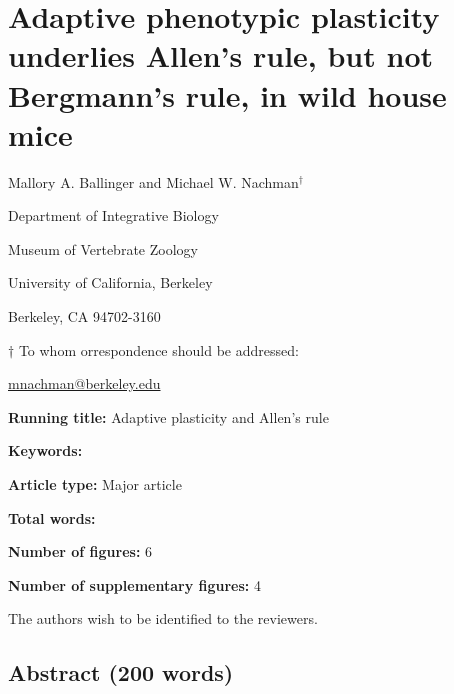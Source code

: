 \documentclass[]{article}
\author{}
\date{\vspace{-2.5em}}
\begin{document}
\hypertarget{adaptive-phenotypic-plasticity-underlies-allens-rule-but-not-bergmanns-rule-in-wild-house-mice}{%
\section{Adaptive phenotypic plasticity underlies Allen's rule, but not
Bergmann's rule, in wild house
mice}\label{adaptive-phenotypic-plasticity-underlies-allens-rule-but-not-bergmanns-rule-in-wild-house-mice}}

\vspace{20mm}

Mallory A. Ballinger and Michael W. Nachman\({^\dagger}\)

\vspace{20mm}

Department of Integrative Biology

Museum of Vertebrate Zoology

University of California, Berkeley

Berkeley, CA 94702-3160

\vspace{10mm}

\({\dagger}\) To whom orrespondence should be addressed:

\href{mailto:mnachman@berkeley.edu}{mnachman@berkeley.edu}

\vspace{30mm}

\textbf{Running title:} Adaptive plasticity and Allen's rule

\textbf{Keywords:}

\textbf{Article type:} Major article

\textbf{Total words:}

\textbf{Number of figures:} 6

\textbf{Number of supplementary figures:} 4

\vspace{5mm}

The authors wish to be identified to the reviewers.

\newpage

\hypertarget{abstract-200-words}{%
\subsection{Abstract (200 words)}\label{abstract-200-words}}
\end{document}
